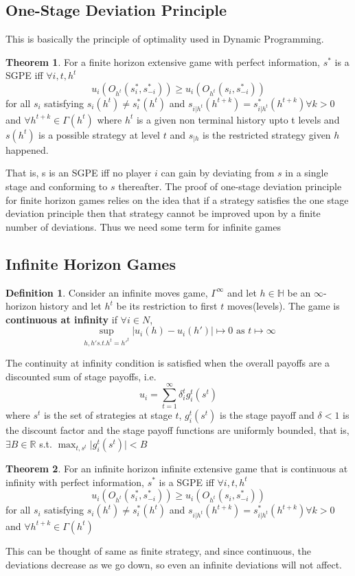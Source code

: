 \documentclass{article}
\theoremstyle{definition}
\newtheorem{theorem}{Theorem}[section]
\newtheorem{defn}{Definition}[section]
\begin{document}
\subsection{One-Stage Deviation Principle}
This is basically the principle of optimality used in Dynamic Programming.
\begin{theorem}
For a finite horizon extensive game with perfect information, $s^*$ is a SGPE iff $\forall i,t,h^t$ $$u_i(O_{h^t}(s_i^*, s_{-i}^*))\geq u_i(O_{h^t}(s_i, s_{-i}^*))$$ for all $s_i$ satisfying $s_i(h^t) \neq s_i^*(h^t)$ and $s_{i\vert h^t}(h^{t+k}) = s_{i\vert h^t}^*(h^{t+k}) \forall k>0$ and $\forall h^{t+k} \in \Gamma(h^t)$ where $h^t$ is a given non terminal history upto t levels and $s(h^t)$ is a possible strategy at level $t$ and $s_{\vert h}$ is the restricted strategy given $h$ happened.
\end{theorem}
That is, s is an SGPE iff no player $i$ can gain by deviating from $s$ in a single stage and conforming to $s$ thereafter. The proof of one-stage deviation principle for finite horizon games relies on the idea that if a strategy satisfies the one stage deviation principle then that strategy cannot be improved upon by a finite number of deviations. Thus we need some term for infinite games
\subsection{Infinite Horizon Games}
\begin{defn}
Consider an infinite moves game, $\Gamma^{\infty}$ and let $h\in \mathbb{H}$ be an $\infty$-horizon history and let $h^t$ be its restriction to first $t$ moves(levels). The game is \textbf{continuous at infinity} if $\forall i\in N$, 
$$ \sup_{h,h' s.t. h^t = h'^t} \vert u_i(h) - u_i(h') \vert \mapsto 0 \text{ as } t \mapsto \infty$$
\end{defn}
The continuity at infinity condition is satisfied when the overall payoffs are a discounted sum of stage payoffs, i.e. $$u_i = \sum_{t=1}^{\infty}\delta_i^t g_i^t(s^t)$$ where $s^t$ is the set of strategies at stage $t$, $g_i^t(s^t)$ is the stage payoff and $\delta<1$ is the discount factor and the stage payoff functions are uniformly bounded, that is, $\exists B\in \mathbb{R}$ s.t. $\max_{t,s^t} \vert g_i^t(s^t) \vert < B$
\begin{theorem}
For an infinite horizon infinite extensive game that is continuous at infinity with perfect information, $s^*$ is a SGPE iff $\forall i,t,h^t$ $$u_i(O_{h^t}(s_i^*, s_{-i}^*))\geq u_i(O_{h^t}(s_i, s_{-i}^*))$$ for all $s_i$ satisfying $s_i(h^t) \neq s_i^*(h^t)$ and $s_{i\vert h^t}(h^{t+k}) = s_{i\vert h^t}^*(h^{t+k}) \forall k>0$ and $\forall h^{t+k} \in \Gamma(h^t)$
\end{theorem}
This can be thought of same as finite strategy, and since continuous, the deviations decrease as we go down, so even an infinite deviations will not affect.
\end{document}
